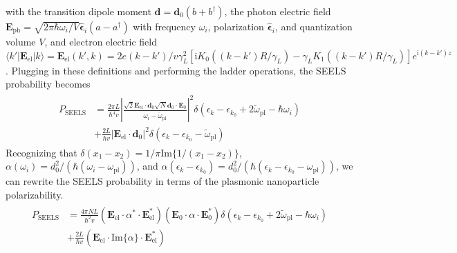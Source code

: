 \documentclass [11pt, proquest] {uwthesis}[2016/11/22]
\begin{document}
with the transition dipole moment $\textbf{d} = \textbf{d}_0(b + b^{\dagger})$, the photon electric field $\textbf{E}_{\textrm{ph}} = \sqrt{2\pi\hbar\omega_i/V}\hat{\boldsymbol{\epsilon}}_i(a - a^{\dagger})$ with frequency $\omega_i$, polarization $\hat{\boldsymbol{\epsilon}}_i$, and quantization volume $V$, and electron electric field $\langle k'|\textbf{E}_{\textrm{el}}|k\rangle = \textbf{E}_{\textrm{el}}(k',k) = 2e(k-k')/v\gamma_L^2[\textrm{i}K_0((k-k') R/\gamma_L)-\gamma_LK_1((k-k') R/\gamma_L)]e^{\textrm{i}(k-k') z}$. Plugging in these definitions and performing the ladder operations, the SEELS probability becomes
\begin{align}
\begin{split}
  P_{\textrm{SEELS}} &= \frac{2\pi L}{\hbar^4v}\left|\frac{\sqrt{2}\textbf{E}_{\textrm{el}}\cdot\textbf{d}_0 \sqrt{N}\textbf{d}_0\cdot\textbf{E}_{0}}{\omega_i - \tilde{\omega}_{\textrm{pl}}}\right|^2\delta(\epsilon_k - \epsilon_{k_0} + 2\tilde{\omega}_{\textrm{pl}} - \hbar\omega_i)\\
  &+ \frac{2L}{\hbar v}|\textbf{E}_{\textrm{el}}\cdot\textbf{d}_0|^2\delta(\epsilon_k - \epsilon_{k_0} - \tilde{\omega}_{\textrm{pl}})
  \label{change_eels}
  \end{split}
\end{align}
Recognizing that $\delta(x_1 - x_2) = 1/\pi\textrm{Im}\{1/(x_1-x_2)\}$, $\alpha(\omega_i) = d_0^2/(\hbar(\omega_i-\omega_{\textrm{pl}}))$, and $\alpha(\epsilon_k-\epsilon_{k_0}) = d_0^2/(\hbar(\epsilon_k-\epsilon_{k_0}-\omega_{\textrm{pl}}))$, we can rewrite the SEELS probability in terms of the plasmonic nanoparticle polarizability.
\begin{align}
\begin{split}
  P_{\textrm{SEELS}} &= \frac{4\pi NL}{\hbar^2v}(\textbf{E}_{\textrm{el}}\cdot\alpha^*\cdot\textbf{E}_{\textrm{el}}^*)(\textbf{E}_0\cdot\alpha\cdot\textbf{E}_0^*)\delta(\epsilon_k - \epsilon_{k_0} + 2\tilde{\omega}_{\textrm{pl}} - \hbar\omega_i)\\
  &+ \frac{2L}{\hbar v}(\textbf{E}_{\textrm{el}}\cdot\textrm{Im}\{\alpha\}\cdot\textbf{E}_{\textrm{el}}^*)
  \label{seels_with_polar}
  \end{split}
\end{align}
\end{document}
